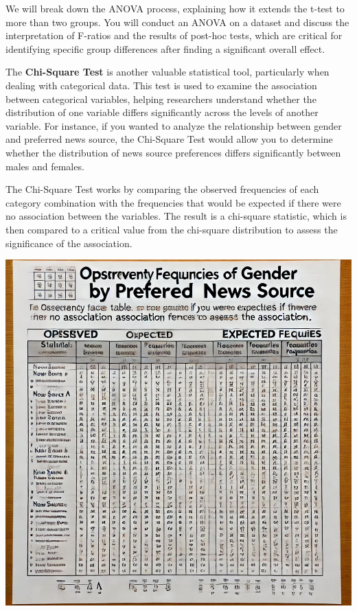 \documentclass[
]{book}
\begin{document}
We will break down the ANOVA process, explaining how it extends the t-test to more than two groups. You will conduct an ANOVA on a dataset and discuss the interpretation of F-ratios and the results of post-hoc tests, which are critical for identifying specific group differences after finding a significant overall effect.

The \textbf{Chi-Square Test} is another valuable statistical tool, particularly when dealing with categorical data. This test is used to examine the association between categorical variables, helping researchers understand whether the distribution of one variable differs significantly across the levels of another variable. For instance, if you wanted to analyze the relationship between gender and preferred news source, the Chi-Square Test would allow you to determine whether the distribution of news source preferences differs significantly between males and females.

The Chi-Square Test works by comparing the observed frequencies of each category combination with the frequencies that would be expected if there were no association between the variables. The result is a chi-square statistic, which is then compared to a critical value from the chi-square distribution to assess the significance of the association.

\includegraphics[width=1\textwidth,height=\textheight]{images/fig058.jpg}
\end{document}
